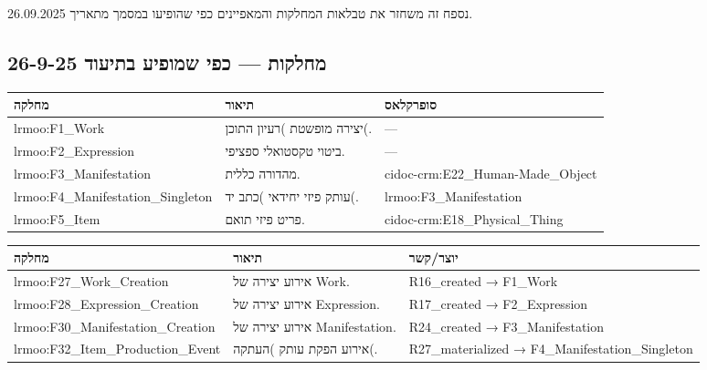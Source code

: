 \documentclass[12pt,a4paper]{article}
\newcommand{\en}[1]{\textenglish{\LR{#1}}}
\begin{document}
נספח זה משחזר את טבלאות המחלקות והמאפיינים כפי שהופיעו במסמך \textenglish{} מתאריך 26.09.2025.

\subsection{מחלקות \en{(Classes)} — כפי שמופיע בתיעוד 26-9-25}

{\small
\begin{longtable}{|p{4.5cm}|p{8.5cm}|p{3cm}|}
\hline
\textbf{מחלקה} & \textbf{תיאור} & \textbf{סופרקלאס} \\
\hline
\endhead

\textenglish{lrmoo:F1\_Work} & יצירה מופשטת )רעיון התוכן(. & — \\
\hline
\textenglish{lrmoo:F2\_Expression} & ביטוי טקסטואלי ספציפי. & — \\
\hline
\textenglish{lrmoo:F3\_Manifestation} & מהדורה כללית. & \textenglish{cidoc-crm:E22\_Human-Made\_Object} \\
\hline
\textenglish{lrmoo:F4\_Manifestation\_Singleton} & עותק פיזי יחידאי )כתב יד(. & \textenglish{lrmoo:F3\_Manifestation} \\
\hline
\textenglish{lrmoo:F5\_Item} & פריט פיזי \en{(LRMoo)} תואם. & \textenglish{cidoc-crm:E18\_Physical\_Thing} \\
\hline
\end{longtable}
}

{\small
\begin{longtable}{|p{4.5cm}|p{8.5cm}|p{3cm}|}
\hline
\textbf{מחלקה} & \textbf{תיאור} & \textbf{יוצר/קשר} \\
\hline
\endhead

\textenglish{lrmoo:F27\_Work\_Creation} & אירוע יצירה של \textenglish{Work}. & \textenglish{R16\_created → F1\_Work} \\
\hline
\textenglish{lrmoo:F28\_Expression\_Creation} & אירוע יצירה של \textenglish{Expression}. & \textenglish{R17\_created → F2\_Expression} \\
\hline
\textenglish{lrmoo:F30\_Manifestation\_Creation} & אירוע יצירה של \textenglish{Manifestation}. & \textenglish{R24\_created → F3\_Manifestation} \\
\hline
\textenglish{lrmoo:F32\_Item\_Production\_Event} & אירוע הפקת עותק )העתקה(. & \textenglish{R27\_materialized → F4\_Manifestation\_Singleton} \\
\hline
\end{longtable}
}
\end{document}
